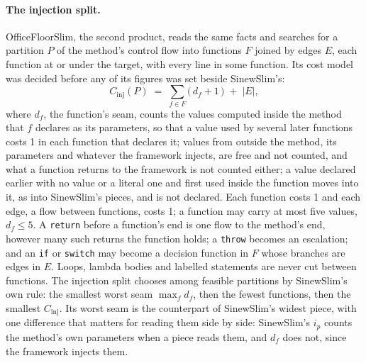 \documentclass[11pt,a4paper]{article}
\newcommand{\sig}[1]{\texttt{#1}}
\begin{document}
\paragraph{The injection split.} OfficeFloorSlim, the second product, reads
the same facts and searches for a partition $P$ of the method's control flow
into functions $F$ joined by edges $E$, each function at or under the target,
with every line in some function. Its cost model was decided before any of
its figures was set beside SinewSlim's:
\begin{equation}\label{eq:injection}
  C_{\mathrm{inj}}(P) \;=\; \sum_{f \in F} \bigl(\, d_f + 1 \,\bigr) \;+\; |E|,
\end{equation}
where $d_f$, the function's seam, counts the values computed inside the
method that $f$ declares as its parameters, so that a value used by several
later functions costs 1 in each function that declares it; values from
outside the method, its parameters and whatever the framework injects, are
free and not counted, and what a function returns to the framework is not
counted either; a value declared earlier with no value or a literal one and
first used inside the function moves into it, as into SinewSlim's pieces,
and is not declared. Each function costs 1 and each edge, a flow between
functions, costs 1; a function may carry at most five values, $d_f \le 5$. A
\sig{return} before a function's end is one flow to the method's end,
however many such returns the function holds; a \sig{throw} becomes an
escalation; and an \sig{if} or \sig{switch} may become a decision function
in $F$ whose branches are edges in $E$. Loops, lambda bodies and labelled statements are never cut
between functions. The injection split chooses among feasible partitions by
SinewSlim's own rule: the smallest worst seam $\max_f d_f$, then the fewest
functions, then the smallest $C_{\mathrm{inj}}$. Its worst seam is the
counterpart of SinewSlim's widest piece, with one difference that matters for
reading them side by side: SinewSlim's $i_p$ counts the method's own
parameters when a piece reads them, and $d_f$ does not, since the framework
injects them.
\end{document}

